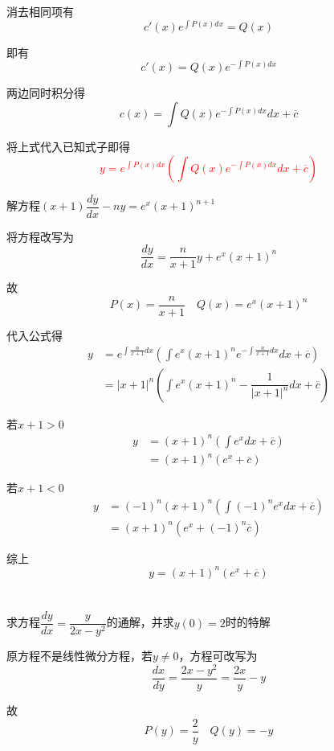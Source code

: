 \documentclass[oneside]{book} %
\begin{document}
消去相同项有
$$c'(x)e^{\int P(x) dx} = Q(x)$$

即有
$$c'(x) = Q(x)e^{-\int P(x) dx} $$

两边同时积分得
$$c(x) = \int Q(x)e^{-\int P(x) dx} dx+ \overline{c}$$

将上式代入已知式子即得
\textcolor{red}{$$y = e^{\int P(x) dx}\left(\int Q(x)e^{-\int P(x) dx} dx+ \overline{c}\right) $$}

\noindent {}解方程$(x + 1) \dfrac{dy}{dx} - ny = e^{x}(x + 1)^{n + 1}$

\noindent {}

将方程改写为
$$\frac{dy}{dx} = \frac{n}{x + 1}y + e^{x}(x + 1)^{n}$$

故
$$P(x) = \frac{n}{x + 1} \quad Q(x) = e^{x}(x + 1)^{n}$$

代入公式得
\begin{align*}
    y & = e^{\int \frac{n}{x + 1} dx}\left(\int e^{x}(x + 1)^{n} e^{-\int \frac{n}{x + 1} dx} dx + \overline{c}\right) \\
    & = \left\lvert x + 1 \right\rvert ^{n}\left(\int e^{x}(x + 1)^{n} - \dfrac{1}{\left\lvert x + 1 \right\rvert ^{n}}dx + \overline{c}\right) 
\end{align*}

若$x + 1 > 0$
\begin{align*}
    y & = (x + 1)^{n}\left(\int e^{x}dx + \overline{c}\right) \\
    & = (x + 1)^{n}\left(e^{x} + \overline{c}\right)
\end{align*}

若$x + 1 < 0$
\begin{align*}
    y & = (-1)^{n}(x + 1)^{n}\left(\int (-1)^{n}e^{x}dx + \overline{c}\right) \\
    & = (x + 1)^{n}\left(e^{x} + (-1)^{n}\overline{c}\right)
\end{align*}

综上
$$ y = (x + 1)^{n}\left(e^{x} + \overline{c}\right)$$
\\ \hspace*{\fill} \\
\noindent {}求方程$\dfrac{dy}{dx} = \dfrac{y}{2x - y ^{2}}$的通解，并求$y(0) = 2$时的特解

\noindent {}

原方程不是线性微分方程，若$y \neq 0$，方程可改写为
$$ \frac{dx}{dy} = \frac{2x - y^{2}}{y} = \frac{2x}{y} - y$$

故
$$P(y) = \frac{2}{y} \quad Q(y) = -y$$
\end{document}
